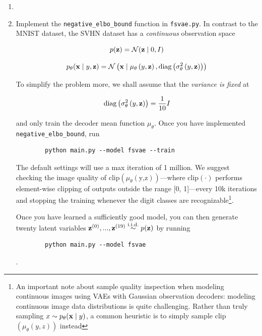\begin{enumerate}[label=(\alph*)]
    \item 

    \item {} Implement the \texttt{negative\_elbo\_bound} function in \texttt{fsvae.py}. In contrast to the MNIST dataset, 
    the SVHN dataset has a \textit{continuous} observation space

    \begin{equation} \label{eq:31}
        p(\mathbf{z}) = \mathcal{N}(\mathbf{z} \mid 0, I)
    \end{equation}

    \begin{equation} \label{eq:32}
        p_{\theta}(\mathbf{x} \mid y, \mathbf{z}) = \mathcal{N}\left(\mathbf{x} \mid \mu_{\theta}\left(y,\mathbf{z}\right), \text{diag}\left(\sigma_{\theta}^2\left(y, \mathbf{z}\right)\right)\right)
    \end{equation}

    To simplify the problem more, we shall assume that the \textit{variance is fixed} at

    \begin{equation} \label{eq:33}
       \text{diag}\left(\sigma_{\theta}^2\left(y, \mathbf{z}\right)\right) = \frac{1}{10}I
    \end{equation}

    and only train the decoder mean function $\mu_{\theta}$. Once you have implemented \texttt{negative\_elbo\_bound}, run
    \begin{verbatim}
        python main.py --model fsvae --train 
    \end{verbatim}
    The default settings will use a max iteration of 1 million. We suggest checking the image quality of 
    $\text{clip}\left(\mu_{\theta}\left(\text{y,z}\right)\right)$—where $\text{clip}(\cdot)$ performs element-wise clipping of 
    outputs outside the range [0, 1]—every 10k iterations and stopping the training whenever the digit classes are recognizable\footnote{An important note about sample quality inspection when modeling continuous images using VAEs with Gaussian observation decoders: modeling continuous image data distributions is quite challenging. Rather than truly sampling $x \sim p_{\theta}(\mathbf{x} \mid y)$, a common heuristic is to simply sample clip$(\mu_{\theta}(y,z))$ instead}.

    Once you have learned a sufficiently good model, you can then generate twenty latent variables $\mathbf{z}^{(0)},...,\mathbf{z}^{(19)} \overset{\text{i.i.d.}}{\sim} p(\mathbf{z})$ 
    by running 
    \begin{verbatim}
        python main.py --model fsvae
    \end{verbatim}. 
    

\end{enumerate}
